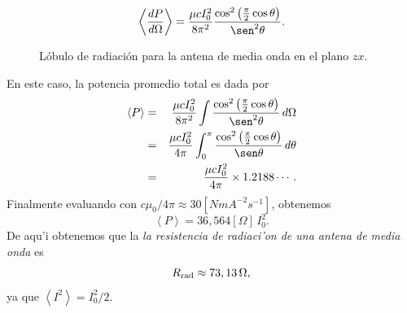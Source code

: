 \begin{equation}
 \left\langle\frac{dP}{d\Omega}\right\rangle=\frac{\mu c I_0^2}{8\pi^2}\frac{\cos^2\left(\frac{\pi}{2}\cos\theta\right)}{\sen^2\theta}.
\end{equation}
%
\begin{figure}[H]
\centerline{}
 \caption{L\'obulo de radiaci\'on para la antena de media onda en el plano $zx$.}
\label{fig:lobulo_antena}
\end{figure}


En este caso, la potencia promedio total es dada por
\begin{eqnarray}
 \left\langle P\right\rangle
&=&\frac{\mu c I_0^2}{8\pi^2}\int\frac{\cos^2\left(\frac{\pi}{2}\cos\theta\right)}{\sen^2\theta}\,d\Omega \\
&=&\frac{\mu c I_0^2}{4\pi}\int_0^\pi\frac{\cos^2\left(\frac{\pi}{2}\cos\theta\right)}{\sen\theta}\,d\theta\\
&=&\frac{\mu c I_0^2}{4\pi}\times 1.2188\cdots .
\end{eqnarray}
Finalmente evaluando con $c\mu_0/4\pi\approx 30 [NmA^{-2}s^{-1}]$, obtenemos
\begin{equation}
 \left\langle P\right\rangle
=36,564[\Omega]\,I_0^2.
\end{equation}
De aqu'i obtenemos que la \textit{la resistencia de radiaci'on de una antena de media onda} es
\begin{equation}
 R_{\rm rad}\approx 73,13\,\Omega,
\end{equation}
ya que $\left\langle I^2\right\rangle=I_0^2/2$.
